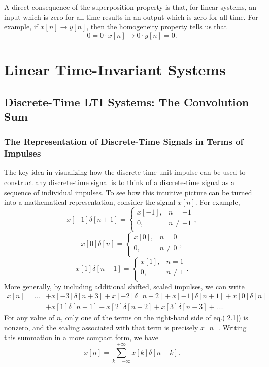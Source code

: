 \documentclass[a4paper,10pt,twoside]{book}
\begin{document}
A direct consequence of the superposition property is that, for linear systems, an input which is zero for all time results in an output which is zero for all time. For example, if $x[n]\to y[n]$, then the homogeneity property tells us that
\begin{equation}
    0=0\cdot x[n]\to0\cdot y[n]=0.
    \label{1.125}
\end{equation}

\chapter{Linear Time-Invariant Systems}
\section{Discrete-Time LTI Systems: The Convolution Sum}
\subsection{The Representation of Discrete-Time Signals in Terms of Impulses}

The key idea in visualizing how the discrete-time unit impulse can be used to construct any discrete-time signal is to think of a discrete-time signal as a sequence of individual impulses. To see how this intuitive picture can be turned into a mathematical representation, consider the signal $x[n]$. For example, $$\left.x[-1]\delta[n+1]=\left\{\begin{array}{ll}{x[-1],}&{n=-1}\\{0,}&{n\neq-1}\\\end{array}\right.\right.,$$$$x[0]\delta[n] = \left\{\begin{array}{ll}{x[0],}&{n = 0}\\{0,}&{n \neq 0}\\\end{array}\right.,$$$$\left.x[1]\delta[n-1]=\left\{\begin{array}{ll}{x[1],}&{n=1}\\{0,}&{n\neq1}\\\end{array}\right.\right..$$ More generally, by including additional shifted, scaled impulses, we can write
\begin{equation}
    \begin{aligned}x[n]=\dots&+ x[-3]\delta[n+3]+ x[-2]\delta[n+2]+ x[-1]\delta[n+1]+ x[0]\delta[n]\\&+ x[1]\delta[n-1]+x[2]\delta[n-2]+x[3]\delta[n-3]+\ldots.\end{aligned}
    \label{2.1}
\end{equation}
For any value of $n$, only one of the terms on the right-hand side of eq.\;(\ref{2.1}) is nonzero, and the scaling associated with that term is precisely $x[n]$. Writing this summation in a more compact form, we have
\begin{equation}
    x[n]=\sum_{k=-\infty}^{+\infty}x[k]\delta[n-k].
    \label{2.2}
\end{equation}
\end{document}
